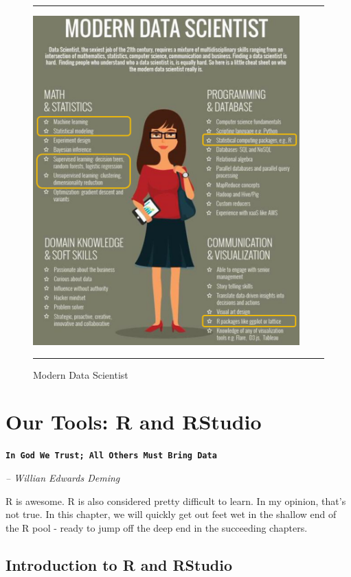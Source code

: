 \documentclass[10pt, letterpaper, twoside]{memoir}\usepackage{knitr}
\newcommand{\chapterendsymbol}{
    \vspace{24pt}
    \Huge
    \hrulefill \hspace{0.1in} \hspace{0.1in} \hrulefill
    \normalsize
    }
\begin{document}
\begin{figure}
\rule{4in}{1pt}
\centering
\includegraphics[height=5in]{images/datascientist.png}
\caption{Modern Data Scientist}
\label{fig:datascientist}
\rule{4in}{1pt}
\end{figure}

\chapterendsymbol





\chapter{Our Tools: R and RStudio}

\begin{flushright}
\textbf{\texttt{In God We Trust; All Others Must Bring Data}}

\emph{-- Willian Edwards Deming}
\end{flushright}

\vspace{12pt}

R is awesome. R is also considered pretty difficult to learn. In my opinion, that's not true. In this chapter, we will quickly get out feet wet in the shallow end of the R pool - ready to jump off the deep end in the succeeding chapters.

\section{Introduction to R and RStudio}
\end{document}
